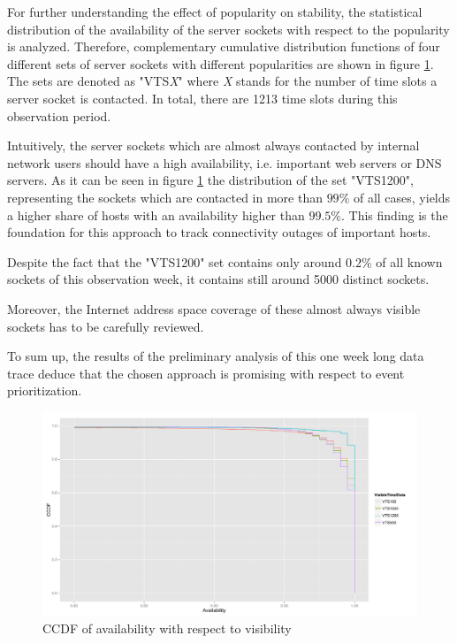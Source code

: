 \documentclass{sigcomm-alternate}
\begin{document}
For further understanding the effect of popularity on stability, the statistical 
distribution of the availability of the server sockets
with respect to the popularity is analyzed. Therefore, complementary cumulative 
distribution functions of four different sets of server sockets with different 
popularities are shown in figure \ref{fig:RatioVTS}. The sets are denoted as
"VTS\emph{X}" where \emph{X} stands for the number of time slots a server socket
is contacted. In total, there are 1213 time slots during this observation period.  

Intuitively, the server sockets which are almost always
contacted by internal network users should have a high availability,
i.e. important web servers or DNS servers. As it can be seen in
figure \ref{fig:RatioVTS} the distribution of the set "VTS1200", representing the
sockets which are contacted in more than $99\%$ of all cases,
yields a higher share of hosts with an availability higher than $99.5\%$.
This finding is the foundation for this approach to track connectivity outages of important hosts.

Despite the fact that the "VTS1200" set contains only around $0.2\%$
of all known sockets of this observation week, it contains still around
5000 distinct sockets.

Moreover, the Internet address space coverage of these almost always
visible sockets has to be carefully reviewed.

To sum up, the results of the preliminary analysis of this one week
long data trace deduce that the chosen approach is promising with
respect to event prioritization.

\begin{figure}[ht!]
\centering \includegraphics[width=18cm]{images/RATIO_VTS_External.pdf}
\caption{CCDF of availability with respect to visibility}
\label{fig:RatioVTS}
\end{figure}



\end{document}
